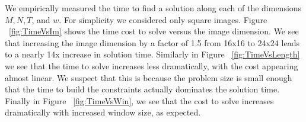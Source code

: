 We empirically measured the time to find a solution along each of the dimensions $M, N, T$, and $w$. For simplicity we considered only square images. Figure ~\ref{fig:TimeVsIm} shows the time cost to solve versus the image dimension. We see that increasing the image dimension by a factor of 1.5 from 16x16 to 24x24 leads to a nearly 14x increase in solution time. Similarly in Figure ~\ref{fig:TimeVsLength} we see that the time to solve increases less dramatically, with the cost appearing almost linear. We suspect that this is because the problem size is small enough that the time to build the constraints actually dominates the solution time. Finally in Figure ~\ref{fig:TimeVsWin}, we see that the cost to solve increases dramatically with increased window size, as expected.

%
%
%
